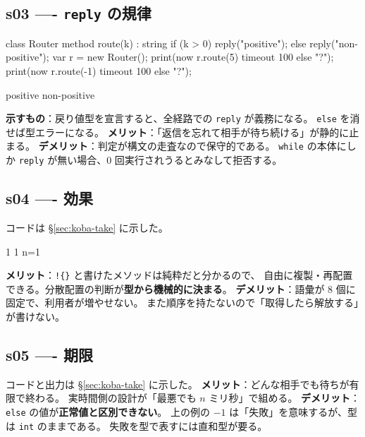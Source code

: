 \documentclass[11pt,a4paper]{ltjsarticle}
\theoremstyle{definition}
\theoremstyle{remark}
\begin{document}
\subsection{s03 ---- \texttt{reply} の規律}
\begin{aipl}
class Router {
  method route(k) : string {
    if (k > 0) { reply("positive"); } else { reply("non-positive"); }
  }
}
var r = new Router();
print(now r.route(5)  timeout 100 else "?");
print(now r.route(-1) timeout 100 else "?");
\end{aipl}
\begin{term}
positive
non-positive
\end{term}
\textbf{示すもの}：戻り値型を宣言すると、全経路での \texttt{reply} が義務になる。
\texttt{else} を消せば型エラーになる。
\textbf{メリット}：「返信を忘れて相手が待ち続ける」が静的に止まる。
\textbf{デメリット}：判定が構文の走査なので保守的である。
\texttt{while} の本体にしか \texttt{reply} が無い場合、0 回実行されうるとみなして拒否する。

\subsection{s04 ---- 効果}
コードは \S\ref{sec:koba-take} に示した。
\begin{term}
1
1
n=1
\end{term}
\textbf{メリット}：\texttt{!\{\}} と書けたメソッドは純粋だと分かるので、
自由に複製・再配置できる。分散配置の判断が\textbf{型から機械的に決まる}。
\textbf{デメリット}：語彙が 8 個に固定で、利用者が増やせない。
また順序を持たないので「取得したら解放する」が書けない。

\subsection{s05 ---- 期限}
コードと出力は \S\ref{sec:koba-take} に示した。
\textbf{メリット}：どんな相手でも待ちが有限で終わる。
実時間側の設計が「最悪でも $n$ ミリ秒」で組める。
\textbf{デメリット}：\texttt{else} の値が\textbf{正常値と区別できない}。
上の例の $-1$ は「失敗」を意味するが、型は \texttt{int} のままである。
失敗を型で表すには直和型が要る。
\end{document}
